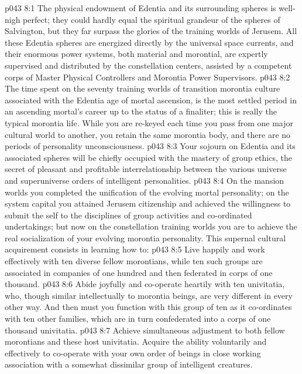 \vs p043 8:1 The physical endowment of Edentia and its surrounding spheres is well\hyp{}nigh perfect; they could hardly equal the spiritual grandeur of the spheres of Salvington, but they far surpass the glories of the training worlds of Jerusem. All these Edentia spheres are energized directly by the universal space currents, and their enormous power systems, both material and morontial, are expertly supervised and distributed by the constellation centers, assisted by a competent corps of Master Physical Controllers and Morontia Power Supervisors.
\vs p043 8:2 The time spent on the seventy training worlds of transition morontia culture associated with the Edentia age of mortal ascension, is the most settled period in an ascending mortal’s career up to the status of a finaliter; this is really the typical morontia life. While you are re\hyp{}keyed each time you pass from one major cultural world to another, you retain the same morontia body, and there are no periods of personality unconsciousness.
\vs p043 8:3 Your sojourn on Edentia and its associated spheres will be chiefly occupied with the mastery of group ethics, the secret of pleasant and profitable interrelationship between the various universe and superuniverse orders of intelligent personalities.
\vs p043 8:4 On the mansion worlds you completed the unification of the evolving mortal personality; on the system capital you attained Jerusem citizenship and achieved the willingness to submit the self to the disciplines of group activities and co\hyp{}ordinated undertakings; but now on the constellation training worlds you are to achieve the real socialization of your evolving morontia personality. This supernal cultural acquirement consists in learning how to:
\pc \vs p043 8:5 \bibnobreakspace Live happily and work effectively with ten diverse fellow morontians, while ten such groups are associated in companies of one hundred and then federated in corps of one thousand.
\pc \vs p043 8:6 \bibnobreakspace Abide joyfully and co\hyp{}operate heartily with ten univitatia, who, though similar intellectually to morontia beings, are very different in every other way. And then must you function with this group of ten as it co\hyp{}ordinates with ten other families, which are in turn confederated into a corps of one thousand univitatia.
\pc \vs p043 8:7 \bibnobreakspace Achieve simultaneous adjustment to both fellow morontians and these host univitatia. Acquire the ability voluntarily and effectively to co\hyp{}operate with your own order of beings in close working association with a somewhat dissimilar group of intelligent creatures.
